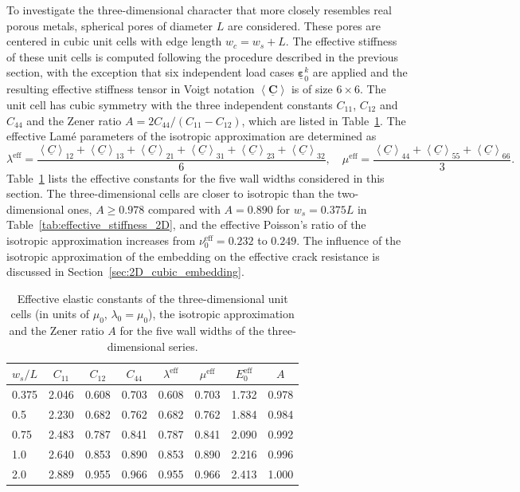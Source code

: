 \documentclass[pdflatex,sn-mathphys-num]{sn-jnl}%
\theoremstyle{thmstyleone}%
\theoremstyle{thmstyletwo}%
\theoremstyle{thmstylethree}%
\begin{document}
To investigate the three-dimensional character that more closely resembles real porous metals, spherical pores of diameter $L$ are considered. These pores are centered in cubic unit cells with edge length $w_c = w_s + L$. The effective stiffness of these unit cells is computed following the procedure described in the previous section, with the exception that six independent load cases $\underline{\boldsymbol{\varepsilon}}_0^k$ are applied and the resulting effective stiffness tensor in Voigt notation 
$\left< \underline{\boldsymbol{C}} \right>$ is of size $6\times6$. The unit cell has cubic symmetry with the three independent constants $C_{11}$, $C_{12}$ and $C_{44}$ and the Zener ratio $A = 2C_{44}/(C_{11}-C_{12})$, which are listed in Table~\ref{tab:effective_stiffness_3D}. The effective Lam\'e parameters of the isotropic approximation are determined as
\begin{equation}
    \lambda^{\text{eff}} = \dfrac{\left< \underline{C} \right>_{12} + \left< \underline{C} \right>_{13} + \left< \underline{C} \right>_{21} + \left< \underline{C} \right>_{31} + \left< \underline{C} \right>_{23} + \left< \underline{C} \right>_{32}}{6}, \quad
    \mu^{\text{eff}} = \dfrac{\left< \underline{C} \right>_{44} + \left< \underline{C} \right>_{55} + \left< \underline{C} \right>_{66}}{3}.
\end{equation}
Table~\ref{tab:effective_stiffness_3D} lists the effective constants for the five wall widths considered in this section. The three-dimensional cells are closer to isotropic than the two-dimensional ones, $A \ge 0.978$ compared with $A = 0.890$ for $w_s = 0.375L$ in Table~\ref{tab:effective_stiffness_2D}, and the effective Poisson's ratio of the isotropic approximation increases from $\nu_0^{\text{eff}} = 0.232$ to $0.249$. The influence of the isotropic approximation of the embedding on the effective crack resistance is discussed in Section~\ref{sec:2D_cubic_embedding}.
\begin{table}[htb]
\centering
\caption{Effective elastic constants of the three-dimensional unit cells (in units of $\mu_0$, $\lambda_0 = \mu_0$), the isotropic approximation and the Zener ratio $A$ for the five wall widths of the three-dimensional series.}
\label{tab:effective_stiffness_3D}
\begin{tabular}{lccccccc}
\toprule
$w_s/L$ & $C_{11}$ & $C_{12}$ & $C_{44}$ & $\lambda^{\text{eff}}$ & $\mu^{\text{eff}}$ & $E_0^{\text{eff}}$ & $A$ \\
\midrule
0.375 & 2.046 & 0.608 & 0.703 & 0.608 & 0.703 & 1.732 & 0.978 \\
0.5   & 2.230 & 0.682 & 0.762 & 0.682 & 0.762 & 1.884 & 0.984 \\
0.75  & 2.483 & 0.787 & 0.841 & 0.787 & 0.841 & 2.090 & 0.992 \\
1.0   & 2.640 & 0.853 & 0.890 & 0.853 & 0.890 & 2.216 & 0.996 \\
2.0   & 2.889 & 0.955 & 0.966 & 0.955 & 0.966 & 2.413 & 1.000 \\
\bottomrule
\end{tabular}
\end{table}
\end{document}
